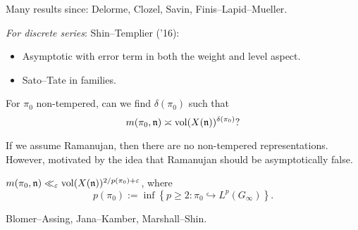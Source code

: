 \documentclass[reqno]{amsart} 
\begin{document}
Many results since: Delorme, Clozel, Savin, Finis--Lapid--Mueller.

\emph{For discrete series}: Shin--Templier ('16):
\begin{itemize}
\item Asymptotic with error term in both the weight and level aspect.
\item Sato--Tate in families.
\end{itemize}

\begin{question}
  For $\pi_0 $ non-tempered, can we find $\delta (\pi_0 )$ such that
  \begin{equation*}
m (\pi_0 , \mathfrak{n} ) \asymp \operatorname{vol} (X (\mathfrak{n} ))^{\delta (\pi_0)}?
  \end{equation*}
\end{question}
If we assume Ramanujan, then there are no non-tempered representations.  However, motivated by the idea that Ramanujan should be asymptotically false.

\begin{conjecture}
  $m (\pi_0, \mathfrak{n} ) \ll_\varepsilon \operatorname{vol} (X (\mathfrak{n} ))^{2 / p (\pi_0 ) + \varepsilon }$, where
  \begin{equation*}
    p (\pi_0 ) := \inf \left\{ p \geq 2 : \pi_0 \hookrightarrow L^p ( G _\infty ) \right\}.
  \end{equation*}
\end{conjecture}
Blomer--Assing, Jana--Kamber, Marshall--Shin.
\end{document}

